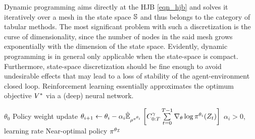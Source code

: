 \documentclass[12pt,twoside]{../../mitthesis}
\begin{document}
Dynamic programming aims directly at the HJB \eqref{eqn_hjb} and solves it iteratively over a mesh in the state space $\states$ and thus belongs to the category of tabular methods.
The most significant problem with such a discretization is the curse of dimensionality, since the number of nodes in the said mesh grows exponentially with the dimension of the state space.
Evidently, dynamic programming is in general only applicable when the state-space is compact.
Furthermore, state-space discretization should be fine enough to avoid undesirable effects that may lead to a loss of stability of the agent-environment closed loop.
Reinforcement learning essentially approximates the optimum objective $\Value^*$ via a (deep) neural network.
\begin{algorithmic}
 $\theta_0$
    \STATE Policy weight update
    \STATE $\theta_{i+1} \la \theta_i - \alpha_i \Es[\trajpdf^{\policy^{\theta_i}}]{ \Cost^\gamma_{0:T} \sum \limits_{t=0}^{T-1} \nabla_\theta \log \policy^{\theta_i} ( \Traj_t ) }$
    \STATE $\alpha_i > 0$, learning rate
\ENDFOR
\STATE \RETURN Near-optimal policy $\policy^{\theta_{\mathcal I}}$
\end{algorithmic}
\printbibliography
%
%
\end{document}

